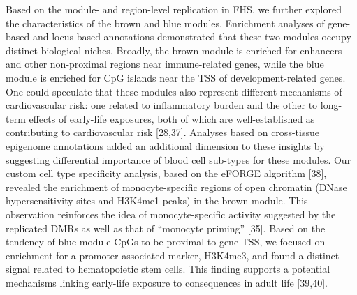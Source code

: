 \documentclass[]{article}
\theoremstyle{definition}
\theoremstyle{definition}
\theoremstyle{definition}
\theoremstyle{remark}
\begin{document}
Based on the module- and region-level replication in FHS, we further
explored the characteristics of the brown and blue modules. Enrichment
analyses of gene-based and locus-based annotations demonstrated that
these two modules occupy distinct biological niches. Broadly, the brown
module is enriched for enhancers and other non-proximal regions near
immune-related genes, while the blue module is enriched for CpG islands
near the TSS of development-related genes. One could speculate that
these modules also represent different mechanisms of cardiovascular
risk: one related to inflammatory burden and the other to long-term
effects of early-life exposures, both of which are well-established as
contributing to cardiovascular risk {[}28,37{]}. Analyses based on
cross-tissue epigenome annotations added an additional dimension to
these insights by suggesting differential importance of blood cell
sub-types for these modules. Our custom cell type specificity analysis,
based on the eFORGE algorithm {[}38{]}, revealed the enrichment of
monocyte-specific regions of open chromatin (DNase hypersensitivity
sites and H3K4me1 peaks) in the brown module. This observation
reinforces the idea of monocyte-specific activity suggested by the
replicated DMRs as well as that of ``monocyte priming'' {[}35{]}. Based
on the tendency of blue module CpGs to be proximal to gene TSS, we
focused on enrichment for a promoter-associated marker, H3K4me3, and
found a distinct signal related to hematopoietic stem cells. This
finding supports a potential mechanisms linking early-life exposure to
consequences in adult life {[}39,40{]}.
\end{document}
